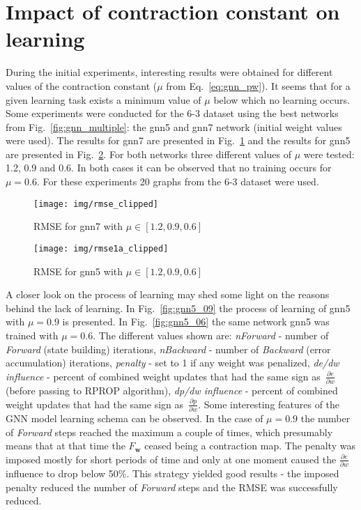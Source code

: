 \section{Impact of contraction constant on learning~\label{sec:contraction_constant}}
During the initial experiments, interesting results were obtained for different values of the contraction constant ($\mu$ from Eq.~\ref{eq:gnn_pw}). It seems that for a given learning task exists a minimum value of $\mu$ below which no learning occurs. Some experiments were conducted for the 6-3 dataset using the best networks from Fig.~\ref{fig:gnn_multiple}: the gnn5 and gnn7 network (initial weight values were used). The results for gnn7 are presented in Fig.~\ref{fig:gnn7} and the results for gnn5 are presented in Fig.~\ref{fig:gnn5}. For both networks three different values of $\mu$ were tested: 1.2, 0.9 and 0.6. In both cases it can be observed that no training occurs for $\mu = 0.6$. For these experiments 20 graphs from the 6-3 dataset were used.

\begin{figure}[h!]
\begin{center}
	\texttt{[image: img/rmse\_clipped]}
	\caption{RMSE for gnn7 with $\mu \in [1.2, 0.9, 0.6]$}
	\label{fig:gnn7}
\end{center}
\end{figure}

\begin{figure}[h!]
\begin{center}
	\texttt{[image: img/rmse1a\_clipped]}
	\caption{RMSE for gnn5 with $\mu \in [1.2, 0.9, 0.6]$}
	\label{fig:gnn5}
\end{center}
\end{figure}

A closer look on the process of learning may shed some light on the reasons behind the lack of learning. In Fig.~\ref{fig:gnn5_09} the process of learning of gnn5 with $\mu = 0.9$ is presented. In Fig.~\ref{fig:gnn5_06} the same network gnn5 was trained with $\mu = 0.6$. The different values shown are: \emph{nForward} - number of \emph{Forward} (state building) iterations, \emph{nBackward} - number of \emph{Backward} (error accumulation) iterations, \emph{penalty} - set to 1 if any weight was penalized, \emph{de/dw influence} - percent of combined weight updates that had the same sign as~$\frac{\partial e}{\partial w}$ (before passing to RPROP algorithm), \emph{dp/dw influence} - percent of combined weight updates that had the same sign as~$\frac{\partial p}{\partial w}$. Some interesting features of the GNN model learning schema can be observed. In the case of $\mu = 0.9$ the number of \emph{Forward} steps reached the maximum a couple of times, which presumably means that at that time the $F_{\bm{w}}$ ceased being a contraction map. The penalty was imposed mostly for short periods of time and only at one moment caused the $\frac{\partial e}{\partial w}$ influence to drop below 50\%. This strategy yielded good results - the imposed penalty reduced the number of \emph{Forward} steps and the RMSE was successfully reduced.

